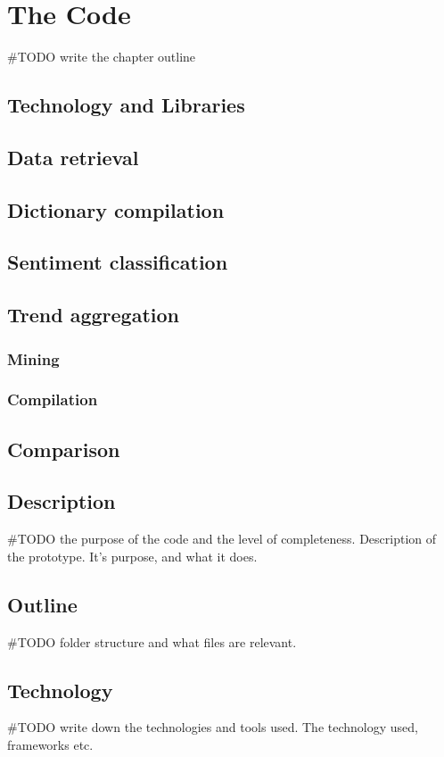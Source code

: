 \chapter{The Code}
#TODO write the chapter outline 


\section{Technology and Libraries}


\section{Data retrieval}
\section{Dictionary compilation}
\section{Sentiment classification}
\section{Trend aggregation}
\subsection{Mining}
\subsection{Compilation}
\section{Comparison}


\section{Description}
#TODO the purpose of the code and the level of completeness. 
Description of the prototype. It's purpose, and what it does. 

\section{Outline}
#TODO folder structure and what files are relevant. 

\section{Technology}
#TODO write down the technologies and tools used. 
The technology used, frameworks etc.

